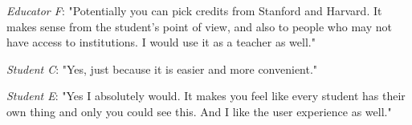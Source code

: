 \textit{Educator F}: "Potentially you can pick credits from Stanford and Harvard.
It makes sense from the student's point of view, and also to people who may not have access to institutions.
I would use it as a teacher as well."

\textit{Student C}: "Yes, just because it is easier and more convenient."

\textit{Student E}: "Yes I absolutely would. It makes you feel like every student has their own thing and 
only you could see this. And I like the user experience as well."
